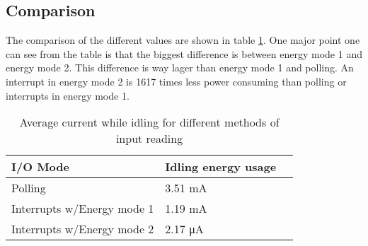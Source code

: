 \subsection{Comparison}

The comparison of the different values are shown in table \ref{tab:energy_usage}.
One major point one can see from the table is that the biggest difference is between energy mode 1 and energy mode 2. This difference is way lager than energy mode 1 and polling. An interrupt in energy mode 2 is 1617 times less power consuming than polling or interrupts in energy mode 1.

\begin{table}[ht!]
    \begin{center}
    \begin{tabular}{ | l | l | l | }
        \hline
        I/O Mode    & Idling energy usage \\
        \hline
        Polling & 3.51 mA \\
        \hline
        Interrupts w/Energy mode 1 & 1.19 mA \\
        \hline
        Interrupts w/Energy mode 2 & 2.17 \si{\micro\ampere} \\
        \hline
    \end{tabular}
    \caption{Average current while idling for different methods of input reading}
    \label{tab:energy_usage}
    \end{center}
\end{table}

